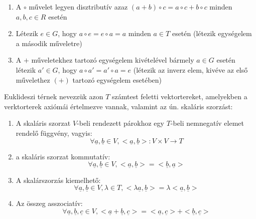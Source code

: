 \documentclass[11pt,a4paper]{article}
\begin{document}
\begin{tcolorbox}[colback=blue!5!white,colframe=blue!70!black,title= 1. Csoport{,} gyűrű{,} test]
\begin{enumerate}
            \item A \(\circ\) művelet legyen disztributív azaz \((a + b) \circ c = a \circ c + b \circ c\) minden \(a, b, c \in R\) esetén
            \item Létezik \(e \in G\), hogy \(a \circ e = e \circ a = a\) minden \(a \in T\) esetén (létezik egységelem a második műveletre)
            \item A \(+\) műveletekhez tartozó egységelem kivételével bármely \(a \in G\) esetén létezik \(a' \in G\), hogy \(a \circ a' = a' \circ a = e\) (létezik az inverz elem, kivéve az első művelethez \((+)\) tartozó egységelem
            esetében)
        \end{enumerate}
\end{tcolorbox}
\begin{tcolorbox}[colback=blue!5!white,colframe=blue!70!black,title= 2. Euklideszi tér]
Euklideszi térnek nevezzük azon \(T\) számtest feletti vektortereket, amelyekben a verktorterek axiómái értelmezve vannak, valamint az ún. skaláris szorzást:    
    \begin{enumerate}
        \item A skaláris szorzat \(V\)-beli rendezett párokhoz egy \(T\)-beli nemnegatív elemet rendelő függvény, vagyis:
        $$\forall \underline{a},\underline{b} \in V,<\underline{a},\underline{b}>:V \times V \to T$$
        \item a skaláris szorzat kommutatív:
        $$\forall \underline{a}, \underline{b} \in V, <\underline{a}, \underline{b} > =<\underline{b}, \underline{a} >$$
        \item A skalárszorzás kiemelhető:
        $$\forall \underline {a},\underline{b} \in V, \lambda \in T, <\lambda \underline{a}, \underline{b} > = \lambda <\underline{a}, \underline{b}>$$
        \item Az összeg asszociatív:
        $$\forall \underline{a}, \underline{b}, \underline{c} \in V, <\underline{a} + \underline{b},\underline{c}> = <\underline{a}, \underline{c}> + <\underline{b}, \underline{c}>$$
    \end{enumerate}
\end{tcolorbox}
\end{document}
